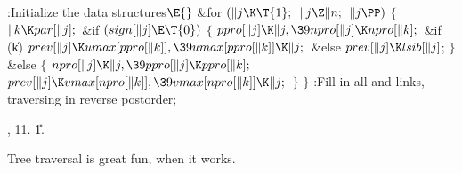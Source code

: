 \Y\B\4:Initialize the data structures\X${}\E{}$\6
\&{for} ${}(\|j\K\T{1};{}$ ${}\|j\Z\|n;{}$ ${}\|j\PP){}$\5
${}\{{}$\1\6
${}\|k\K\\{par}[\|j];{}$\6
\&{if} ${}(\\{sign}[\|j]\E\T{0}){}$\5
${}\{{}$\1\6
${}\\{ppro}[\|j]\K\|j,\39\\{npro}[\|j]\K\\{npro}[\|k];{}$\6
\&{if} (\|k)\1\5
${}\\{prev}[\|j]\K\\{umax}[\\{ppro}[\|k]],\39\\{umax}[\\{ppro}[\|k]]\K\|j;{}$\2%
\6
\&{else}\1\5
${}\\{prev}[\|j]\K\\{lsib}[\|j]{}$;\2\6
\4${}\}{}$\5
\2\&{else}\5
${}\{{}$\1\6
${}\\{npro}[\|j]\K\|j,\39\\{ppro}[\|j]\K\\{ppro}[\|k];{}$\6
${}\\{prev}[\|j]\K\\{vmax}[\\{npro}[\|k]],\39\\{vmax}[\\{npro}[\|k]]\K\|j;{}$\6
\4${}\}{}$\2\6
\4${}\}{}$\2\6
:Fill in all  and  links, traversing in reverse
postorder\X;\par
{}, 11.
\U1.\fi

Tree traversal is great fun, when it works.

